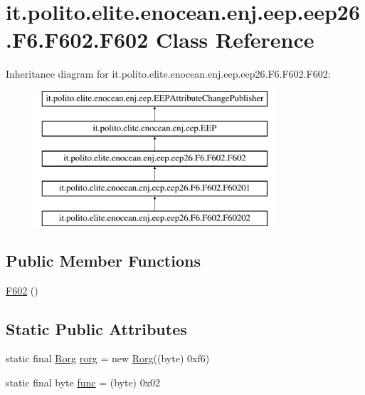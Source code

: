 \hypertarget{classit_1_1polito_1_1elite_1_1enocean_1_1enj_1_1eep_1_1eep26_1_1_f6_1_1_f602_1_1_f602}{}\section{it.\+polito.\+elite.\+enocean.\+enj.\+eep.\+eep26.\+F6.\+F602.\+F602 Class Reference}
\label{classit_1_1polito_1_1elite_1_1enocean_1_1enj_1_1eep_1_1eep26_1_1_f6_1_1_f602_1_1_f602}
Inheritance diagram for it.\+polito.\+elite.\+enocean.\+enj.\+eep.\+eep26.\+F6.\+F602.\+F602\+:\begin{figure}[H]
\begin{center}
\leavevmode
\includegraphics[height=5.000000cm]{classit_1_1polito_1_1elite_1_1enocean_1_1enj_1_1eep_1_1eep26_1_1_f6_1_1_f602_1_1_f602}
\end{center}
\end{figure}
\subsection*{Public Member Functions}
\begin{DoxyCompactItemize}
\item 
\hyperlink{classit_1_1polito_1_1elite_1_1enocean_1_1enj_1_1eep_1_1eep26_1_1_f6_1_1_f602_1_1_f602_aac0d7eaf0a480fc6ee52a23a2abfdd84}{F602} ()
\end{DoxyCompactItemize}
\subsection*{Static Public Attributes}
\begin{DoxyCompactItemize}
\item 
static final \hyperlink{classit_1_1polito_1_1elite_1_1enocean_1_1enj_1_1eep_1_1_rorg}{Rorg} \hyperlink{classit_1_1polito_1_1elite_1_1enocean_1_1enj_1_1eep_1_1eep26_1_1_f6_1_1_f602_1_1_f602_a3f2b5df388ad4986011544acf2289d1d}{rorg} = new \hyperlink{classit_1_1polito_1_1elite_1_1enocean_1_1enj_1_1eep_1_1_rorg}{Rorg}((byte) 0xf6)
\item 
static final byte \hyperlink{classit_1_1polito_1_1elite_1_1enocean_1_1enj_1_1eep_1_1eep26_1_1_f6_1_1_f602_1_1_f602_a6a383b470089952a0e4e40cafe094103}{func} = (byte) 0x02
\end{DoxyCompactItemize}
